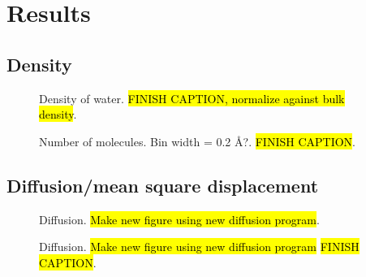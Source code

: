 \chapter{Results}
\section{Density}
\begin{figure}[htpb]%
    \centering%
    \caption{%
        Density of water. \hl{FINISH CAPTION, normalize against bulk density}. %
    }%
\end{figure}%
\begin{figure}[htpb]%
    \centering%
    \caption{%
        Number of molecules. Bin width = 0.2 \AA?. \hl{FINISH CAPTION}. %
    }%
\end{figure}%

\FloatBarrier
\section{Diffusion/mean square displacement}
\begin{figure}[htpb]%
    \centering%
    {
        \newcommand{\f}{\footnotesize}
    }
    \caption{%
        Diffusion. \hl{Make new figure using new diffusion program}. %
    }%
\end{figure}%

\begin{figure}[htpb]%
    \centering%
    {
        \newcommand{\f}{\footnotesize}%
    }
    \caption{%
        Diffusion. \hl{Make new figure using new diffusion program} \hl{FINISH CAPTION}. %
    }%
\end{figure}%

